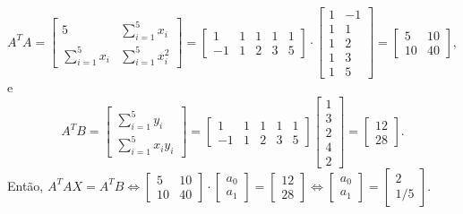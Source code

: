 \documentclass[12pt,a4paper]{article}
\begin{document}
\begin{ExerciseList}
\[\]
\[
A^T A
= \begin{bmatrix}
 5                & \sum_{i=1}^5 x_i \\
\sum_{i=1}^5 x_i  & \sum_{i=1}^5 x_i^2
\end{bmatrix}
=\begin{bmatrix}
 1 & 1 & 1 & 1 & 1 \\
-1 & 1 & 2 & 3 & 5
\end{bmatrix}
\cdot
\begin{bmatrix}
  1 & -1 \\
  1 &  1 \\
  1 &  2 \\
  1 &  3 \\
  1 &  5
\end{bmatrix}
=\begin{bmatrix}
5 & 10 \\ 10 & 40
\end{bmatrix},
\]
e
\[
A^T B
= \begin{bmatrix}
 \sum_{i=1}^5 y_i \\
 \sum_{i=1}^5 x_i y_i
\end{bmatrix}
= \begin{bmatrix}
 1 & 1 & 1 & 1 & 1 \\
-1 & 1 & 2 & 3 & 5
\end{bmatrix}
\begin{bmatrix}
1 \\ 3 \\ 2 \\ 4 \\ 2
\end{bmatrix}
= \begin{bmatrix}
12 \\ 28
\end{bmatrix}.
\]
Então, 
$
A^T A X = A^T B
\Leftrightarrow
\begin{bmatrix}
5 & 10 \\ 10 & 40
\end{bmatrix}
\cdot
\begin{bmatrix}
a_0\\
a_1
\end{bmatrix}
=
\begin{bmatrix}
12 \\ 28
\end{bmatrix} 
\Leftrightarrow
\begin{bmatrix}
a_0\\
a_1
\end{bmatrix}
=
\begin{bmatrix}
2\\
1/5
\end{bmatrix}.
$


\end{ExerciseList}
\end{document}
